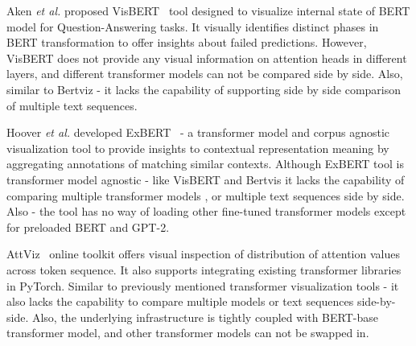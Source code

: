 \documentclass[journal]{vgtc}                %
\begin{document}



Aken \MakeLowercase{\textit{et al.}} proposed VisBERT~\cite{aken2020visbert} tool designed to visualize internal state of BERT model for Question-Answering tasks. It visually identifies distinct phases in BERT transformation to offer insights about failed predictions. However, VisBERT does not provide any visual information on attention heads in different layers, and different transformer models can not be compared side by side. Also, similar to Bertviz - it lacks the capability of supporting side by side comparison of multiple text sequences. 

Hoover \MakeLowercase{\textit{et al.}} developed ExBERT~\cite{hoover-etal-2020-exbert} - a transformer model and corpus agnostic visualization tool to provide insights to contextual representation meaning by aggregating annotations of matching similar contexts. Although ExBERT tool is transformer model agnostic - like VisBERT and Bertvis it lacks the capability of comparing multiple transformer models , or multiple text sequences side by side. Also - the tool has no way of loading other fine-tuned transformer models except for preloaded BERT and GPT-2. 

AttViz~\cite{skrlj-etal-2021-exploring} online toolkit offers visual inspection of distribution of attention values across token sequence. It also supports integrating existing transformer libraries in PyTorch. Similar to previously mentioned transformer visualization tools - it also lacks the capability to compare multiple models or text sequences side-by-side. Also, the underlying infrastructure is tightly coupled with BERT-base transformer model, and other transformer models can not be swapped in. 
\end{document}
